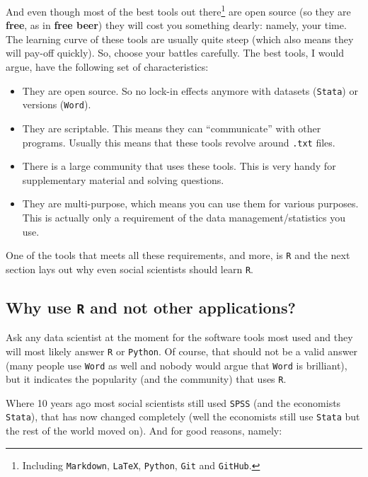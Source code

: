 \documentclass[]{article}
\providecommand{\tightlist}{%
  \setlength{\itemsep}{0pt}\setlength{\parskip}{0pt}}
\let\rmarkdownfootnote\footnote%
\def\footnote{\protect\rmarkdownfootnote}
\begin{document}
And even though most of the best tools out there\footnote{Including
  \texttt{Markdown}, \texttt{LaTeX}, \texttt{Python}, \texttt{Git} and
  \texttt{GitHub}.} are open source (so they are \textbf{free}, as in
\textbf{free beer}) they will cost you something dearly: namely, your
time. The learning curve of these tools are usually quite steep (which
also means they will pay-off quickly). So, choose your battles
carefully. The best tools, I would argue, have the following set of
characteristics:

\begin{itemize}
\tightlist
\item
  They are open source. So no lock-in effects anymore with datasets
  (\texttt{Stata}) or versions (\texttt{Word}).
\item
  They are scriptable. This means they can ``communicate'' with other
  programs. Usually this means that these tools revolve around
  \texttt{.txt} files.
\item
  There is a large community that uses these tools. This is very handy
  for supplementary material and solving questions.
\item
  They are multi-purpose, which means you can use them for various
  purposes. This is actually only a requirement of the data
  management/statistics you use.
\end{itemize}

One of the tools that meets all these requirements, and more, is
\texttt{R} and the next section lays out why even social scientists
should learn \texttt{R}.

\subsection{\texorpdfstring{Why use \texttt{R} and not other
applications?}{Why use R and not other applications?}}\label{why-use-r-and-not-other-applications}

Ask any data scientist at the moment for the software tools most used
and they will most likely answer \texttt{R} or \texttt{Python}. Of
course, that should not be a valid answer (many people use \texttt{Word}
as well and nobody would argue that \texttt{Word} is brilliant), but it
indicates the popularity (and the community) that uses \texttt{R}.

Where 10 years ago most social scientists still used \texttt{SPSS} (and
the economists \texttt{Stata}), that has now changed completely (well
the economists still use \texttt{Stata} but the rest of the world moved
on). And for good reasons, namely:
\end{document}
